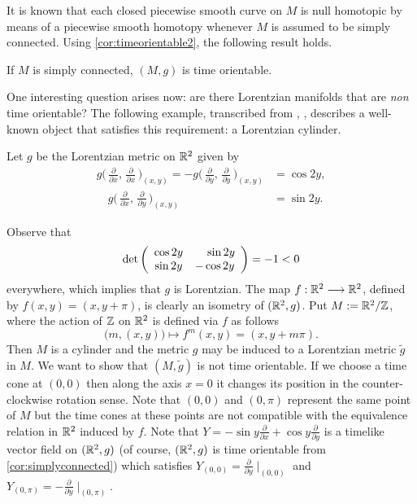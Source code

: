 It is known that each closed piecewise smooth curve on $M$ is null homotopic by means of a piecewise smooth homotopy whenever $M$ is assumed to be simply connected. Using \autoref{cor:timeorientable2}, the following result holds.

\begin{corollary}
	\label{cor:simplyconnected}
	If $M$ is simply connected, $(M,g)$ is time orientable.
\end{corollary}

One interesting question arises now: are there Lorentzian manifolds that are \emph{non} time orientable? The following example, transcribed from \cite[Example 3.5]{romero10}, \cite[Example 1.2.3]{sachs77}, describes a well-known object that satisfies this requirement: a Lorentzian cylinder.

\begin{example}
	Let $g$ be the Lorentzian metric on $\mathbb{R}^2$ given by
	\begin{align*}
	g\Big(\,\frac{\partial}{\partial x},\,\frac{\partial}{\partial x}\,\Big)_{(x,y)}=-g\Big(\,\frac{\partial}{\partial y},\,\frac{\partial}{\partial y}\,\Big)_{(x,y)} &= \cos 2y,\\
	\quad g\Big(\,\frac{\partial}{\partial x},\,\frac{\partial}{\partial y}\,\Big)_{(x,y)}&= \sin 2y.
	\end{align*}
	
	Observe that
	\[
	\mathrm{det}\left(
	\begin{array}{cc}
	\cos 2y & \hspace*{4mm}\sin 2y  \\
	\sin 2y & -\cos 2y
	\end{array} \right) = -1 < 0
	\]
	everywhere, which implies that $g$ is Lorentzian. The map $f : \mathbb{R}^2 \longrightarrow \mathbb{R}^2$, defined by $f(x,y)=(x,y+\pi)$, is clearly an isometry of $(\mathbb{R}^2,g)$. Put $M:=\mathbb{R}^2 / {\mathbb Z}$, where the action of ${\mathbb Z}$ on $\mathbb{R}^2$ is defined via $f$ as follows
	\[
	\big(m,(x,y)\big) \mapsto f^m(x,y)=(x,y+m\pi).
	\]
	Then $M$ is a cylinder and the metric $g$ may be induced to a Lorentzian metric ${\tilde g}$ in $M$. We want to show that $(M,{\tilde g})$ is not time orientable. If we choose a time cone at $(0,0)$ then along the axis $x=0$ it changes its position in the counter-clockwise rotation sense. Note that $(0,0)$ and $(0,\pi)$ represent the same point of $M$ but the time cones at these points are not compatible with the equivalence relation in $\mathbb{R}^2$ induced by $f$. Note that $Y=-\sin y \frac{\partial}{\partial x} + \cos y \frac{\partial}{\partial y}$ is a timelike vector field on $(\mathbb{R}^2,g)$ (of course, $(\mathbb{R}^2,g)$ is time orientable from \autoref{cor:simplyconnected}) which satisfies $Y_{(0,0)}=\frac{\partial}{\partial y}\mid_{(0,0)}$ and $Y_{(0,\pi)}=-\frac{\partial}{\partial y}\mid_{(0,\pi)}$.
	

\end{example}
